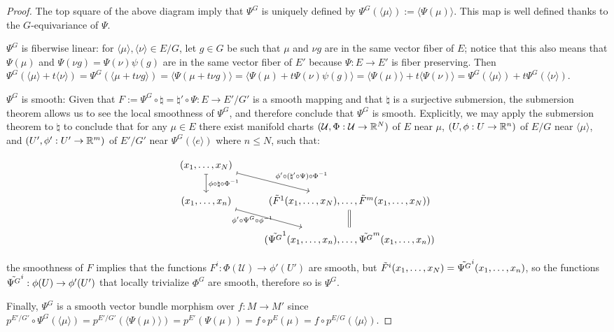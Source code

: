 \begin{proof}
The top square of the above diagram imply that $\Psi^{G}$ is uniquely defined by $\Psi^{G}(\langle \mu \rangle) := \langle \Psi(\mu) \rangle$. This map is well defined thanks to the $G$-equivariance of $\Psi$.

$\Psi^G$ is fiberwise linear: for $\langle \mu \rangle, \langle \nu \rangle \in E/G$, let $g \in G$ be such that $\mu$ and $\nu g$ are in the same vector fiber of $E$; notice that this also means that $\Psi(\mu)$ and $\Psi(\nu g) = \Psi(\nu) \psi(g)$ are in the same vector fiber of $E'$ because $\Psi:E \to E'$ is fiber preserving. 
Then $\Psi^{G}(\langle \mu \rangle + t\langle \nu \rangle) = \Psi^{G}(\langle \mu  + t \nu g \rangle)  = \langle \Psi(\mu + t \nu g ) \rangle = \langle \Psi(\mu) + t \Psi(\nu)\psi(g) \rangle = \langle \Psi(\mu) \rangle + t \langle \Psi(\nu) \rangle = \Psi^{G}(\langle \mu \rangle) + t\Psi^{G}(\langle \nu \rangle)$.

$\Psi^{G}$ is smooth: Given that $F := \Psi^{G} \circ \natural = \natural' \circ \Psi : E \to E'/G'$ is a smooth mapping and that $\natural$ is a surjective submersion, the submersion theorem allows us to see the local smoothness of $\Psi^{G}$, and therefore conclude that $\Psi^{G}$ is smooth. Explicitly, we may apply the submersion theorem to $\natural$  to conclude that for any $\mu \in E$ there exist manifold charts $(\mathcal U, \Phi: \mathcal U \to \mathbb{R}^N)$ of $E$ near $\mu$, $(U, \phi: U \to \RR^n)$ of $E/G$ near $\langle \mu \rangle$, and $(U', \phi': U' \to \RR^m)$ of $E'/G'$ near $\Psi^{G}(\langle e \rangle)$ where $n \leq N$, such that: %

\[
\begin{tikzcd}
    (x_1, \dots, x_N) \arrow[mapsto]{rd}{\phi' \circ (\natural' \circ \Psi) \circ \Phi^{-1} } \arrow[mapsto]{d}{\phi \circ \natural \circ \Phi^{-1}} & \\
    (x_1, \dots, x_n) \arrow[mapsto]{rd}[below, near start]{\phi' \circ \Psi^{G} \circ \phi^{-1}} & (\Tilde F^1(x_1, \dots, x_N), \dots, \Tilde F^m(x_1, \dots, x_N)) \arrow[equal]{d}\\
    & (\Tilde{\Psi^{G}}^1(x_1, \dots, x_n), \dots, \Tilde{\Psi^{G}}^m(x_1, \dots, x_n))
\end{tikzcd}
\]

the smoothness of $F$ implies that the functions $F^i:\Phi(\mathcal U) \to \phi'(U')$ are smooth, but $\Tilde F^i(x_1, \dots, x_N) = \Tilde{\Psi^{G}}^i(x_1, \dots, x_n)$, so the functions $\Tilde{\Psi^{G}}^i:\phi(U) \to \phi'(U')$ that locally trivialize $\Phi^{G}$ are smooth, therefore so is $\Psi^{G}$. 

Finally, $\Psi^{G}$ is a smooth vector bundle morphism over $f:M \to M'$ since $p^{E'/G'} \circ \Psi^{G}(\langle \mu \rangle) = p^{E'/G'}(\langle \Psi(\mu) \rangle) = p^{E'}(\Psi(\mu)) = f \circ p^E (\mu) = f \circ p^{E/G} (\langle \mu \rangle)$.

\end{proof}

